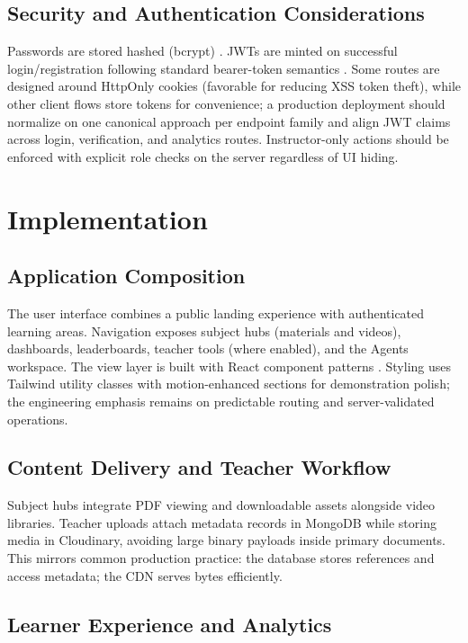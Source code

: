 \documentclass[conference]{IEEEtran}
\begin{document}
\subsection{Security and Authentication Considerations}

Passwords are stored hashed (bcrypt) \cite{b11,b14}. JWTs are minted on successful login/registration following standard bearer-token semantics \cite{b10}. Some routes are designed around HttpOnly cookies (favorable for reducing XSS token theft), while other client flows store tokens for convenience; a production deployment should normalize on one canonical approach per endpoint family and align JWT claims across login, verification, and analytics routes. Instructor-only actions should be enforced with explicit role checks on the server regardless of UI hiding.

\section{Implementation}

\subsection{Application Composition}

The user interface combines a public landing experience with authenticated learning areas. Navigation exposes subject hubs (materials and videos), dashboards, leaderboards, teacher tools (where enabled), and the Agents workspace. The view layer is built with React component patterns \cite{b15}. Styling uses Tailwind utility classes with motion-enhanced sections for demonstration polish; the engineering emphasis remains on predictable routing and server-validated operations.

\subsection{Content Delivery and Teacher Workflow}

Subject hubs integrate PDF viewing and downloadable assets alongside video libraries. Teacher uploads attach metadata records in MongoDB while storing media in Cloudinary, avoiding large binary payloads inside primary documents. This mirrors common production practice: the database stores references and access metadata; the CDN serves bytes efficiently.

\subsection{Learner Experience and Analytics}
\end{document}
